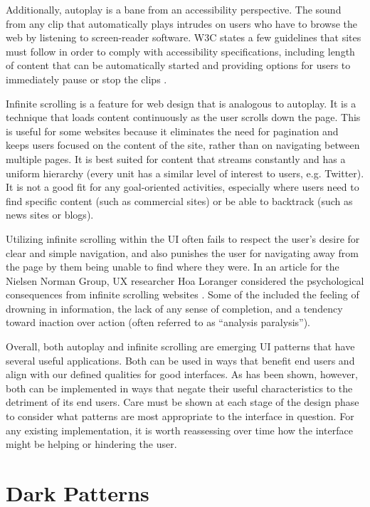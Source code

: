 \documentclass[12pt, oneside]{article}
\begin{document}
Additionally, autoplay is a bane from an accessibility perspective. The sound from any clip that automatically plays intrudes on users who have to browse the web by listening to screen-reader software. W3C states a few guidelines that sites must follow in order to comply with accessibility specifications, including length of content that can be automatically started and providing options for users to immediately pause or stop the clips \cite{punkchip}.

Infinite scrolling is a feature for web design that is analogous to autoplay. It is a technique that loads content continuously as the user scrolls down the page. This is useful for some websites because it eliminates the need for pagination and keeps users focused on the content of the site, rather than on navigating between multiple pages. It is best suited for content that streams constantly and has a uniform hierarchy (every unit has a similar level of interest to users, e.g. Twitter). It is not a good fit for any goal-oriented activities, especially where users need to find specific content (such as commercial sites) or be able to backtrack (such as news sites or blogs).

Utilizing infinite scrolling within the UI often fails to respect the user's desire for clear and simple navigation, and also punishes the user for navigating away from the page by them being unable to find where they were. In an article for the Nielsen Norman Group, UX researcher Hoa Loranger considered the psychological consequences from infinite scrolling websites \cite{loranger_2014}. Some of the included the feeling of drowning in information, the lack of any sense of completion, and a tendency toward inaction over action (often referred to as ``analysis paralysis'').

Overall, both autoplay and infinite scrolling are emerging UI patterns that have several useful applications. Both can be used in ways that benefit end users and align with our defined qualities for good interfaces. As has been shown, however, both can be implemented in ways that negate their useful characteristics to the detriment of its end users. Care must be shown at each stage of the design phase to consider what patterns are most appropriate to the interface in question. For any existing implementation, it is worth reassessing over time how the interface might be helping or hindering the user.

\section{Dark Patterns}
\end{document}
